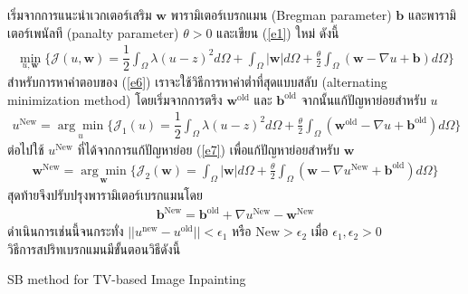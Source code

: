 \documentclass[hidelinks, a4paper,12pt]{article}
\numberwithin{equation}{section}							%
\numberwithin{equation}{section}
\begin{document}
{\begin{itemize}
\hspace{1cm} เริ่มจากการแนะนำเวกเตอร์เสริม $\boldsymbol{w}$ พารามิเตอร์เบรกแมน (Bregman parameter) $\boldsymbol{b}$ และพารามิเตอร์เพนัลที (panalty parameter) $\theta>0$ และเขียน (\ref{e1}) ใหม่ ดังนี้
	\begin{align}
	\min_{u,\boldsymbol{w}} \{ \mathcal{J}(u,\boldsymbol{w}) = \dfrac{1}{2} \int_{\Omega} \lambda(u-z)^2 d\Omega +  \int_{\Omega}  | \boldsymbol{w}|  d\Omega + \frac{\theta}{2} \int_{\Omega} (\boldsymbol{w} - \nabla u + \boldsymbol{b}) d\Omega \}
	\label{e6}
	\end{align}
	\hspace{1cm}สำหรับการหาคำตอบของ (\ref{e6}) เราจะใช้วิธีการหาค่าต่ำที่สุดแบบสลับ (alternating minimization method) โดยเริ่มจากการตรึง $\boldsymbol{w}^{\text{old}}$ และ $\boldsymbol{b}^{\text{old}}$ จากนั้นแก้ปัญหาย่อยสำหรับ $u$
	\begin{align}
	u^{\text{New}}=\underset{u}{\arg\min} \{ \mathcal{J}_1(u) = \dfrac{1}{2} \int_{\Omega} \lambda(u-z)^2 d\Omega + \frac{\theta}{2} \int_{\Omega} (\boldsymbol{w}^{\text{old}} - \nabla u + \boldsymbol{b}^{\text{old}}) d\Omega \}
	\label{e7}
	\end{align}
	ต่อไปใช้ $u^{\text{New}}$ ที่ได้จากการแก้ปัญหาย่อย (\ref{e7}) เพื่อแก้ปัญหาย่อยสำหรับ $\boldsymbol{w}$
	\begin{align}
	\boldsymbol{w}^{\text{New}}=\underset{\boldsymbol{w}}{\arg\min} \{ \mathcal{J}_2(\boldsymbol{w}) = \int_{\Omega}  |\boldsymbol{w}|  d\Omega  + \frac{\theta}{2} \int_{\Omega} (\boldsymbol{w} - \nabla u^{\text{New}} + \boldsymbol{b}^{\text{old}}) d\Omega \}
	\label{e8}
	\end{align}
	สุดท้ายจึงปรับปรุงพารามิเตอร์เบรกแมนโดย 
	\begin{align}
	\boldsymbol{b}^{\text{New}}=\boldsymbol{b}^{\text{old}}+\nabla u^{\text{New}}-\boldsymbol{w}^{\text{New}}
	\label{e9}
	\end{align}
	ดำเนินการเช่นนี้จนกระทั่ง $||u^{\text{new}}-u^{\text{old}}||< \epsilon_1$ หรือ $\text{New}>\epsilon_2$ เมื่อ $\epsilon_1,\epsilon_2>0$ \\ 
	\vspace{0.5cm}
	\hspace{1cm}วิธีการสปริทเบรกแมนมีขั้นตอนวิธีดังนี้ \\
	\vspace{0.5cm}
	\begin{algorithm}[H]
		\SetAlgoNoLine
		\caption{SB method for TV-based Image Inpainting}    
		

\end{algorithm}
\end{itemize}}
\end{document}
